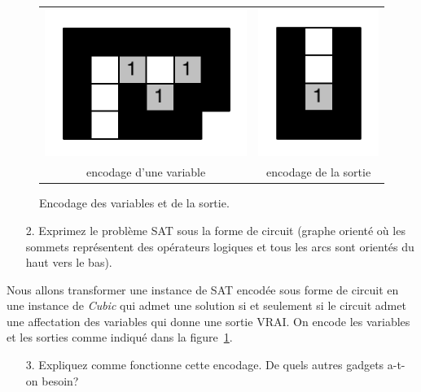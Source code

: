 \documentclass[12pt]{article}
\begin{document}
\begin{figure}[p]
\begin{center}
  \begin{tabular}{c c}
    \includegraphics[scale=0.65]{./figures/variable} &
    \includegraphics[scale=0.65]{./figures/fil}\\
 encodage d'une variable &
 encodage de la sortie
 \end{tabular}
\end{center}
 \caption{Encodage des variables et de la sortie.}
 \label{debutfin}
\end{figure}

\begin{enumerate}
\item[2.] Exprimez le problème SAT sous la forme de circuit (graphe orienté où les sommets représentent des opérateurs logiques et tous les arcs sont orientés du haut vers le bas).
\end{enumerate}

Nous allons transformer une instance de SAT encodée sous forme de circuit en une instance de \textit{Cubic} qui admet une solution si et seulement si le circuit admet une affectation des variables qui donne une sortie VRAI. On encode les variables et les sorties comme indiqué dans la figure~\ref{debutfin}.


\begin{enumerate}
\item[3.] Expliquez comme fonctionne cette encodage. De quels autres gadgets a-t-on besoin?
\end{enumerate}
\end{document}
